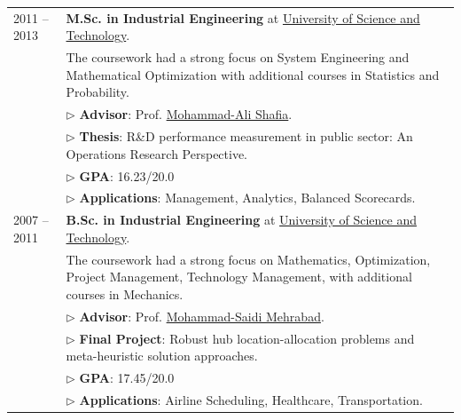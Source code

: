 \documentclass[10PT,letter]{article}
\begin{document}
\begin{tabular}{lp{5.5in}}
	            \textsc{2011 -- 2013} & \textbf{M.Sc. in Industrial Engineering} at \href{http://www.iust.ac.ir/en}{University of Science and Technology}.\\[.5mm]
	            & The coursework had a strong focus on System Engineering and Mathematical Optimization with additional courses in Statistics and Probability.\\[.5mm]
	            & $\triangleright$ {\small\textbf{Advisor}}:  Prof. \href{https://scholar.google.com/citations?hl=en\&user=GV4tnu4AAAAJ\&view_op=list_works\&sortby=pubdate}{Mohammad-Ali Shafia}.\\[1.1mm]
	            & $\triangleright$ {\small\textbf{Thesis}}: R\&D performance measurement in public sector: An Operations Research Perspective.\\
	            & $\triangleright$ {\small\textbf{GPA}}: 16.23/20.0\\
	            & $\triangleright$ {\small\textbf{Applications}}: Management, Analytics, Balanced Scorecards.\\[4mm]
				\textsc{2007 -- 2011} & \textbf{B.Sc. in Industrial Engineering} at \href{http://www.iust.ac.ir/en}{University of Science and Technology}.\\[.5mm]
				& The coursework had a strong focus on Mathematics, Optimization, Project Management, Technology Management,  with additional courses in Mechanics. \\[.5mm]
				& $\triangleright$ {\small\textbf{Advisor}}:  Prof. \href{http://ie.iust.ac.ir/page.php?slct_pg_id=5442\&sid=61\&slc_lang=en}{Mohammad-Saidi Mehrabad}.\\[1.1mm]
				& $\triangleright$ {\small\textbf{Final Project}}: Robust hub location-allocation problems and meta-heuristic solution approaches.\\
				& $\triangleright$ {\small\textbf{GPA}}: 17.45/20.0\\
				& $\triangleright$ {\small\textbf{Applications}}: Airline Scheduling, Healthcare, Transportation.
        \end{tabular}
\end{document}
